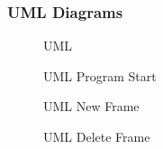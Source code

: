 \documentclass[11pt]{article} %
\begin{document}
{\subsubsection{UML Diagrams}
    \begin{figure}[H]
    	\centering
    	\caption{UML }
    	\label{fig:UML2 }
    \end{figure}
    
\begin{figure}[H]
	\centering
	\caption{UML Program Start}
	\label{fig:UML2 }
\end{figure}

\begin{figure}[H]
 	\centering
 	\caption{UML New Frame}
 	\label{fig:UML2 }
\end{figure}

\begin{figure}[H]
   	\centering
   	\caption{UML Delete Frame}
   	\label{fig:UML2 }
\end{figure}

}
\end{document}
